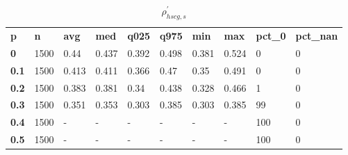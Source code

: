 \begin{table}[h]
 \centering 
\footnotesize
\caption{$\rho_{hscg,s}^\prime $}
\label{tab:alphahscgs}
\begin{tabular}[h]{| l l l l l l l l l l|
    } \hline
\textbf{ p} & \textbf{ n} & \textbf{ avg} & \textbf{ med} & \textbf{ q025} & \textbf{ q975} & \textbf{ min} & \textbf{ max} & \textbf{ pct\_0} & \textbf{ pct\_nan}
           \\
  \textbf{  0} & 1500 &  0.44 & 0.437 & 0.392 & 0.498 & 0.381 & 0.524 &   0 & 0
           \\
  \textbf{0.1} & 1500 & 0.413 & 0.411 & 0.366 &  0.47 &  0.35 & 0.491 &   0 & 0
           \\
  \textbf{0.2} & 1500 & 0.383 & 0.381 &  0.34 & 0.438 & 0.328 & 0.466 &   1 & 0
           \\
  \textbf{0.3} & 1500 & 0.351 & 0.353 & 0.303 & 0.385 & 0.303 & 0.385 &  99 & 0
           \\
  \textbf{0.4} & 1500 & - & - & - & - & - & - & 100 & 0
           \\
  \textbf{0.5} & 1500 & - & - & - & - & - & - & 100 & 0
           \\
 \hline \end{tabular}
 \end{table}
